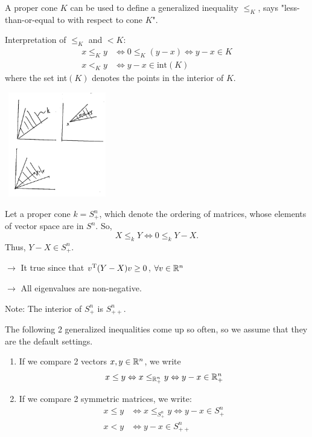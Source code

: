 A proper cone $K$ can be used to define a generalized inequality $\leq_K$, says "less-than-or-equal to with respect to cone $K$".

Interpretation of $\leq_K$ and $< K$:
\begin{align*}
x\leq_K y &\Leftrightarrow 0\leq_K (y-x)\Leftrightarrow y - x \in K\\
x <_Ky &\Leftrightarrow y-x\in \text{int}(K)
\end{align*}
where the set int$(K)$ denotes the points in the interior of $K$.

\begin{marginfigure}
	\centering
	\includegraphics[width=1.8in,height=1.8in]{figures/ch08/figure1030_1.png}
\end{marginfigure}


\begin{example}
	Let a proper cone $k = S^n_+$, which denote the ordering of matrices, whose elements of vector space are in $S^n$. So,
	$$X\leq_k Y \Leftrightarrow 0\leq_k Y-X.$$
	Thus, $Y-X\in S^n_+$.
	
	$\rightarrow$ It true since that $v^{{\rm T}}(Y-X)v \geq 0$, $\forall v\in \mathbb{R}^n$
	
	$\rightarrow$ All eigenvalues are non-negative.
	
	Note: The interior of $S_+^n$ is $S^n_{++}$.
	
\end{example}

\vspace{0.3cm}
The following 2 generalized inequalities come up so often, so we assume that they are the default settings.
\begin{enumerate}
	\item If we compare 2 vectors $x,y\in \mathbb{R}^n$, we write 
	$$x\leq  y\Leftrightarrow x\leq_{\mathbb{R}^n_{+}}y \Leftrightarrow y-x\in \mathbb{R}^n_{+}$$ 
	
	\item If we compare 2 symmetric matrices, we write:
	\begin{align*}
	x\leq y &\Leftrightarrow x\leq_{S_+^n} y\Leftrightarrow y - x\in S^n_{+}\\
	x< y &\Leftrightarrow y - x\in S^n_{++}
	\end{align*}
\end{enumerate}

